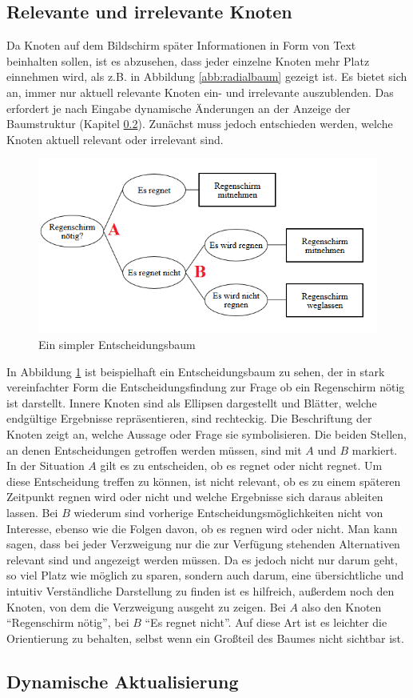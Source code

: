 \subsection{Relevante und irrelevante Knoten}
Da Knoten auf dem Bildschirm später Informationen in Form von Text beinhalten sollen, ist es abzusehen, dass jeder einzelne Knoten mehr Platz einnehmen wird, als z.B. in Abbildung \ref{abb:radialbaum} gezeigt ist. Es bietet sich an, immer nur aktuell relevante Knoten ein- und irrelevante auszublenden. Das erfordert je nach Eingabe dynamische Änderungen an der Anzeige der Baumstruktur (Kapitel \ref{sec:dynamische_aktual}). Zunächst muss jedoch entschieden werden, welche Knoten aktuell relevant oder irrelevant sind. 
\begin{figure}
	\centering
	\includegraphics{../screenshots/entscheidungsbaum_bsp.PNG}
	\caption{Ein simpler Entscheidungsbaum}
	\label{abb:entsch_baum_bsp}
\end{figure}
In Abbildung \ref{abb:entsch_baum_bsp} ist beispielhaft ein Entscheidungsbaum zu sehen, der in stark vereinfachter Form die Entscheidungsfindung zur Frage ob ein Regenschirm nötig ist darstellt. Innere Knoten sind als Ellipsen dargestellt und Blätter, welche endgültige Ergebnisse repräsentieren, sind rechteckig. Die Beschriftung der Knoten zeigt an, welche Aussage oder Frage sie symbolisieren. Die beiden Stellen, an denen Entscheidungen getroffen werden müssen, sind mit $A$ und $B$ markiert. In der Situation $A$ gilt es zu entscheiden, ob es regnet oder nicht regnet. Um diese Entscheidung treffen zu können, ist nicht relevant, ob es zu einem späteren Zeitpunkt regnen wird oder nicht und welche Ergebnisse sich daraus ableiten lassen. Bei $B$ wiederum sind vorherige Entscheidungsmöglichkeiten nicht von Interesse, ebenso wie die Folgen davon, ob es regnen wird oder nicht. Man kann sagen, dass bei jeder Verzweigung nur die zur Verfügung stehenden Alternativen relevant sind und angezeigt werden müssen. Da es jedoch nicht nur darum geht, so viel Platz wie möglich zu sparen, sondern auch darum, eine übersichtliche und intuitiv Verständliche Darstellung zu finden ist es hilfreich, außerdem noch den Knoten, von dem die Verzweigung ausgeht zu zeigen. Bei $A$ also den Knoten ``Regenschirm nötig'', bei $B$ ``Es regnet nicht''. Auf diese Art ist es leichter die Orientierung zu behalten, selbst wenn ein Großteil des Baumes nicht sichtbar ist.

\subsection{Dynamische Aktualisierung}\label{sec:dynamische_aktual}

